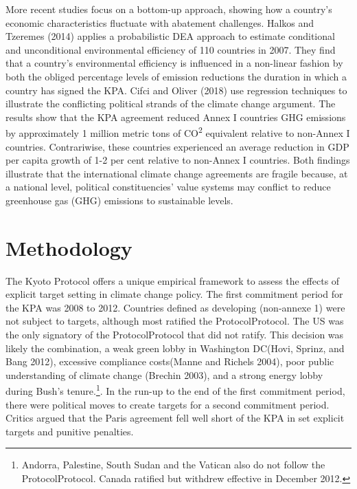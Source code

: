 \documentclass[
  10pt,
]{article}
\begin{document}
More recent studies focus on a bottom-up approach, showing how a
country's economic characteristics fluctuate with abatement challenges.
Halkos and Tzeremes (2014) applies a probabilistic DEA approach to
estimate conditional and unconditional environmental efficiency of 110
countries in 2007. They find that a country's environmental efficiency
is influenced in a non-linear fashion by both the obliged percentage
levels of emission reductions the duration in which a country has signed
the KPA. Cifci and Oliver (2018) use regression techniques to illustrate
the conflicting political strands of the climate change argument. The
results show that the KPA agreement reduced Annex I countries GHG
emissions by approximately 1 million metric tons of
CO\textsuperscript{2} equivalent relative to non-Annex I countries.
Contrariwise, these countries experienced an average reduction in GDP
per capita growth of 1-2 per cent relative to non-Annex I countries.
Both findings illustrate that the international climate change
agreements are fragile because, at a national level, political
constituencies' value systems may conflict to reduce greenhouse gas
(GHG) emissions to sustainable levels.

\hypertarget{methodology}{%
\section{Methodology}\label{methodology}}

The Kyoto Protocol offers a unique empirical framework to assess the
effects of explicit target setting in climate change policy. The first
commitment period for the KPA was 2008 to 2012. Countries defined as
developing (non-annexe 1) were not subject to targets, although most
ratified the ProtocolProtocol. The US was the only signatory of the
ProtocolProtocol that did not ratify. This decision was likely the
combination, a weak green lobby in Washington DC(Hovi, Sprinz, and Bang
2012), excessive compliance costs(Manne and Richels 2004), poor public
understanding of climate change (Brechin 2003), and a strong energy
lobby during Bush's tenure.\footnote{Andorra, Palestine, South Sudan and
  the Vatican also do not follow the ProtocolProtocol. Canada ratified
  but withdrew effective in December 2012.}. In the run-up to the end of
the first commitment period, there were political moves to create
targets for a second commitment period. Critics argued that the Paris
agreement fell well short of the KPA in set explicit targets and
punitive penalties.
\end{document}
